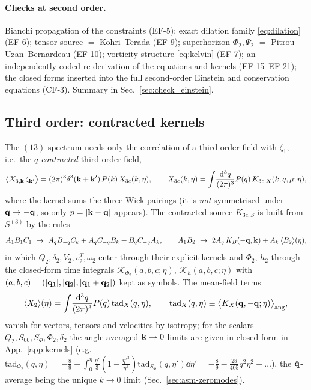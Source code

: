 \paragraph{Checks at second order.}
Bianchi propagation of the constraints (EF-5); exact dilation family \eqref{eq:dilation} (EF-6); tensor source
$=$ Kohri--Terada (EF-9); superhorizon $\Phi_2,\Psi_2$ $=$ Pitrou--Uzan--Bernardeau (EF-10); vorticity structure
\eqref{eq:kelvin} (EF-7); an independently coded re-derivation of the equations and kernels (EF-15--EF-21); the closed forms
inserted into the full second-order Einstein and conservation equations (CF-3).  Summary in Sec.~\ref{sec:check_einstein}.

\subsection{Third order: contracted kernels}
\label{sec:third}
The $(13)$ spectrum needs only the correlation of a third-order field with $\zeta_1$, i.e.\ the
\emph{$q$-contracted} third-order field,
\begin{equation}
\big\langle X_{3,\mathbf k}\,\zeta_{\mathbf k'}\big\rangle=(2\pi)^3\delta^3(\mathbf k+\mathbf k')\,P(k)\,X_{3c}(k,\eta),\qquad
X_{3c}(k,\eta)=\int\!\frac{\mathrm d^3q}{(2\pi)^3}P(q)\,K_{3c,X}(k,q,\mu;\eta),
\label{eq:contracted}
\end{equation}
where the kernel sums the three Wick pairings (it is \emph{not} symmetrised under $\mathbf q\to-\mathbf q$, so only
$p=|\mathbf k-\mathbf q|$ appears).  The contracted source $K_{3c,S}$ is built from $S^{(3)}$ by the rules
\begin{equation}
A_1B_1C_1\ \to\ A_qB_{-q}C_k+A_qC_{-q}B_k+B_qC_{-q}A_k,\qquad
A_1B_2\ \to\ 2A_q\,K_B(-\vq,\vk)+A_k\,\langle B_2\rangle(\eta),
\label{eq:contraction_rules}
\end{equation}
in which $Q_2,\delta_2,V_2,v^T_2,\omega_2$ enter through their explicit kernels and $\Phi_2$, $h_2$ through the
closed-form time integrals $\mathcal K_{\Phi_2}(a,b,c;\eta)$, $\mathcal K_h(a,b,c;\eta)$ with
$(a,b,c)=(|\mathbf q_1|,|\mathbf q_2|,|\mathbf q_1+\mathbf q_2|)$ kept as symbols.  The mean-field terms
\begin{equation}
\langle X_2\rangle(\eta)=\int\!\frac{\mathrm d^3q}{(2\pi)^3}P(q)\,\mathrm{tad}_X(q,\eta),\qquad
\mathrm{tad}_X(q,\eta)\equiv\big\langle K_X(\mathbf q,-\mathbf q;\eta)\big\rangle_{\rm ang},
\label{eq:tad}
\end{equation}
vanish for vectors, tensors and velocities by isotropy; for the scalars $Q_2,S_{00},S_\Phi,\Phi_2,\delta_2$ the
angle-averaged $\mathbf k\to0$ limits are given in closed form in App.~\ref{app:kernels}
(e.g.\ $\mathrm{tad}_{\Phi_2}(q,\eta)=-\tfrac89+\int_0^\eta\frac{\eta'}3(1-\frac{{\eta'}^3}{\eta^3})\mathrm{tad}_{S_\Phi}(q,\eta')\dd\eta'
=-\tfrac89-\tfrac{28}{405}q^2\eta^2+\ldots$), the $\hat{\mathbf q}$-average being the unique $k\to0$ limit (Sec.~\ref{sec:asm-zeromodes}).

